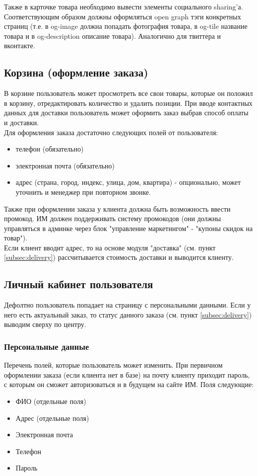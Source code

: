 \documentclass[DIV=calc, paper=a4, fontsize=11pt]{scrartcl} %
\begin{document}
Также в карточке товара необходимо вывести элементы социального sharing'а. Соответствующим образом должны оформляться open graph тэги конкретных страниц (т.е. в og-image должна попадать фотография товара, в og-tile название товара и в og-description описание товара). Аналогично для твиттера и вконтакте.

\subsection{Корзина (оформление заказа)}
В корзине пользователь может просмотреть все свои товары, которые он положил в корзину, отредактировать количество и удалить позиции. При вводе контактных данных для доставки пользователь может оформить заказ выбрав способ оплаты и доставки.
\\[0.5cm]
Для оформления заказа достаточно следующих полей от пользователя:
\begin{itemize}
	\item телефон (обязательно)
	\item электронная почта (обязательно)
	\item адрес (страна, город, индекс, улица, дом, квартира) - опционально, может уточнить и менеджер при повторном звонке.
\end{itemize}

Также при оформлении заказа у клиента должна быть возможность ввести промокод. ИМ должен поддерживать систему промокодов (они должны управляться в админке через блок "управление маркетингом" - "купоны скидок на товар").
\\[0.5cm]
Если клиент вводит адрес, то на основе модуля "доставка" (см. пункт \ref{subsec:delivery}) рассчитывается стоимость доставки и выводится клиенту.

\subsection{Личный кабинет пользователя}
Дефолтно пользователь попадает на страницу с персональными данными. Если у него есть актуальный заказ, то статус данного заказа (см. пункт \ref{subsec:delivery}) выводим сверху по центру.

\subsubsection{Персональные данные}
Перечень полей, которые пользователь может изменить. При первичном оформлении заказа (если клиента нет в базе) на почту клиенту приходит пароль, с которым он сможет авторизоваться и в будущем на сайте ИМ. Поля следующие:
\begin{itemize}
	\item ФИО (отдельные поля)
	\item Адрес (отдельные поля)
	\item Электронная почта
	\item Телефон
	\item Пароль
\end{itemize}
\end{document}
